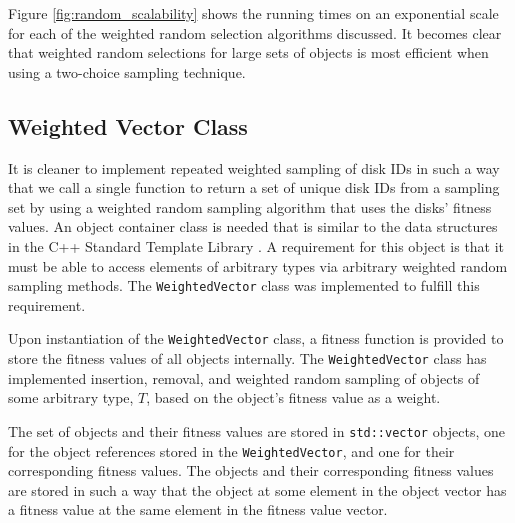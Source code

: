 \documentclass[12pt]{article}
\begin{document}
    \FloatBarrier

    Figure \ref{fig:random_scalability} shows the running times on an
    exponential scale for each of the weighted random selection algorithms
    discussed. It becomes clear that weighted random selections for large sets
    of objects is most efficient when using a two-choice sampling technique.

  \subsection{Weighted Vector Class}

  It is cleaner to implement repeated weighted sampling of disk IDs in such a
  way that we call a single function to return a set of unique disk IDs from a
  sampling set by using a weighted random sampling algorithm that uses the disks'
  fitness values. An object container class is needed that is similar to the data
  structures in the C++ Standard Template Library \cite{stl}. A requirement for
  this object is that it must be able to access elements of arbitrary types via
  arbitrary weighted random sampling methods. The \texttt{WeightedVector} class
  was implemented to fulfill this requirement. 

  Upon instantiation of the \texttt{WeightedVector} class, a fitness function
  is provided to store the fitness values of all objects internally. The
  \texttt{WeightedVector} class has implemented insertion, removal, and
  weighted random sampling of objects of some arbitrary type, $T$, based on the
  object's fitness value as a weight.

  The set of objects and their fitness values are stored in
  \texttt{std::vector} objects, one for the object references stored in the
  \texttt{WeightedVector}, and one for their corresponding fitness values. The
  objects and their corresponding fitness values are stored in such a way that
  the object at some element in the object vector has a fitness value at the
  same element in the fitness value vector.
  
\end{document}
